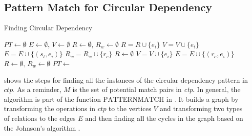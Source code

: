 \subsection{Pattern Match for Circular Dependency}

\begin{algorithm}
\caption{Finding Circular Dependency}\label{algo:circular}
\begin{algorithmic}[1]
\State $\mathit{PT} \gets \emptyset$
\State $\mathit{E} \gets \emptyset$, $\mathit{V} \gets \emptyset$
\State $\mathit{R} \gets \emptyset$, $\mathit{R_w} \gets \emptyset$
\State $\mathit{R} = \mathit{R} \cup \{\mathit{e_i}\}$
\State $\mathit{V} = \mathit{V} \cup \{\mathit{e_i}\}$
 
\State $\mathit{E} = \mathit{E} \cup \{(\mathit{s_l},\mathit{e_i})\}$  
\EndFor
\EndIf
{}
\State $\mathit{R_w} = \mathit{R_w} \cup \{\mathit{r_c}\}$
\EndFor
\State $\mathit{R} \gets \emptyset$ 
\EndIf
{}
\State $\mathit{V} = \mathit{V} \cup \{\mathit{e_i}\}$
  
\State $\mathit{E} = \mathit{E} \cup \{(\mathit{r_c},\mathit{e_i})\}$
\EndFor
\EndIf
\EndFor
\State $\mathit{R} \gets \emptyset$, $\mathit{R_w} \gets \emptyset$
\EndFor
\State $\mathit{PT} \gets$ 
\end{algorithmic}
\end{algorithm}

 shows the steps for finding all the instances of the circular dependency pattern in $\mathit{ctp}$. As a reminder, $M$ is the set of potential match pairs in \emph{ctp}.  In general, the algorithm is part of the function $\mathrm{PATTERNMATCH}$ in . It builds a graph by transforming the operations in $\mathit{ctp}$ to the vertices $\mathit{V}$ and transforming two types of relations to the edges $\mathit{E}$ and then finding all the cycles in the graph based on the Johnson's algorithm \cite{DBLP:journals/siamcomp/Johnson75}.
 
